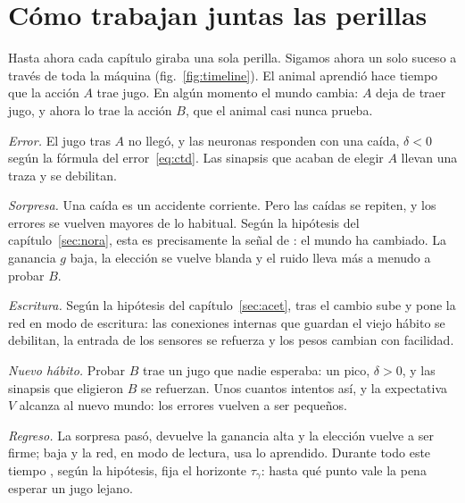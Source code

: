 \section{Cómo trabajan juntas las perillas}

Hasta ahora cada capítulo giraba una sola perilla. Sigamos ahora un solo suceso a través de toda la máquina (fig.~\ref{fig:timeline}). El animal aprendió hace tiempo que la acción $A$ trae jugo. En algún momento el mundo cambia: $A$ deja de traer jugo, y ahora lo trae la acción $B$, que el animal casi nunca prueba.

\emph{Error.} El jugo tras $A$ no llegó, y las neuronas  responden con una caída, $\delta<0$ según la fórmula del error~\eqref{eq:ctd}. Las sinapsis que acaban de elegir $A$ llevan una traza y se debilitan.

\emph{Sorpresa.} Una caída es un accidente corriente. Pero las caídas se repiten, y los errores se vuelven mayores de lo habitual. Según la hipótesis del capítulo~\ref{sec:nora}, esta es precisamente la señal de : el mundo ha cambiado. La ganancia $g$ baja, la elección se vuelve blanda y el ruido lleva más a menudo a probar $B$.

\emph{Escritura.} Según la hipótesis del capítulo~\ref{sec:acet}, tras el cambio  sube y pone la red en modo de escritura: las conexiones internas que guardan el viejo hábito se debilitan, la entrada de los sensores se refuerza y los pesos cambian con facilidad.

\emph{Nuevo hábito.} Probar $B$ trae un jugo que nadie esperaba: un pico, $\delta>0$, y las sinapsis que eligieron $B$ se refuerzan. Unos cuantos intentos así, y la expectativa $V$ alcanza al nuevo mundo: los errores vuelven a ser pequeños.

\emph{Regreso.} La sorpresa pasó,  devuelve la ganancia alta y la elección vuelve a ser firme;  baja y la red, en modo de lectura, usa lo aprendido. Durante todo este tiempo , según la hipótesis, fija el horizonte $\tau_\gamma$: hasta qué punto vale la pena esperar un jugo lejano.

